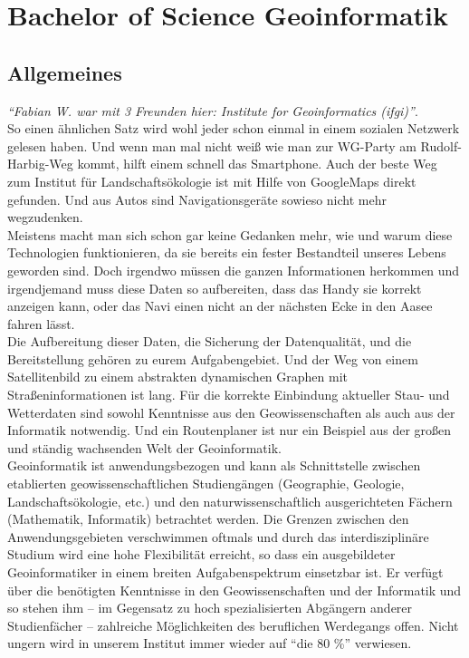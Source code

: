 \chapter{Bachelor of Science Geoinformatik}

\section{Allgemeines}

\emph{"`Fabian W. war mit 3 Freunden hier: Institute for Geoinformatics (ifgi)"'}.\\
So einen ähnlichen Satz wird wohl jeder schon einmal in einem sozialen Netzwerk gelesen haben. Und wenn man mal nicht weiß wie man zur WG-Party am Rudolf-Harbig-Weg kommt, hilft einem schnell das Smartphone. Auch der beste Weg zum Institut für Landschaftsökologie ist mit Hilfe von GoogleMaps direkt gefunden. Und aus Autos sind Navigationsgeräte sowieso nicht mehr wegzudenken.\\
Meistens macht man sich schon gar keine Gedanken mehr, wie und warum diese Technologien funktionieren, da sie bereits ein fester Bestandteil unseres Lebens geworden sind. Doch irgendwo müssen die ganzen Informationen herkommen und irgendjemand muss diese Daten so aufbereiten, dass das Handy sie korrekt anzeigen kann, oder das Navi einen nicht an der nächsten Ecke in den Aasee fahren lässt.\\
Die Aufbereitung dieser Daten, die Sicherung der Datenqualität, und die Bereitstellung gehören zu eurem Aufgabengebiet. Und der Weg von einem Satellitenbild zu einem abstrakten dynamischen Graphen mit Straßeninformationen ist lang. Für die korrekte Einbindung aktueller Stau- und Wetterdaten sind sowohl Kenntnisse aus den Geowissenschaften als auch aus der Informatik notwendig. Und ein Routenplaner ist nur ein Beispiel aus der großen und ständig wachsenden Welt der Geoinformatik.\\
Geoinformatik ist anwendungsbezogen und kann als Schnittstelle zwischen etablierten geowissenschaftlichen Studiengängen (Geographie, Geologie, Landschaftsökologie, etc.) und den naturwissenschaftlich ausgerichteten Fächern (Mathematik, Informatik) betrachtet werden. Die Grenzen zwischen den Anwendungsgebieten verschwimmen oftmals und durch das interdisziplinäre Studium wird eine hohe Flexibilität erreicht, so dass ein ausgebildeter Geoinformatiker in einem breiten Aufgabenspektrum einsetzbar ist. Er verfügt über die benötigten Kenntnisse in den Geowissenschaften und der Informatik und so stehen ihm -- im Gegensatz zu hoch spezialisierten Abgängern anderer Studienfächer -- zahlreiche Möglichkeiten des beruflichen Werdegangs offen. Nicht ungern wird in unserem Institut immer wieder auf "`die 80 \%"' verwiesen.\\
